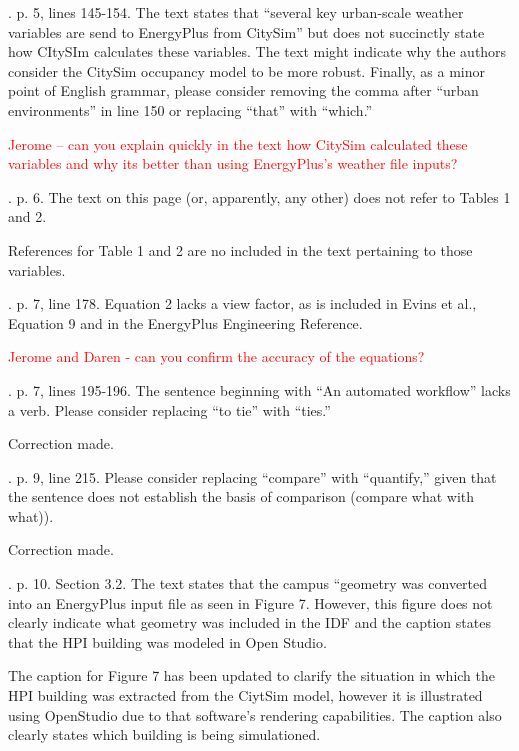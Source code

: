 \documentclass[answers,12pt]{exam}
\begin{document}
\begin{questions}
. p. 5, lines 145-154.  The text states that “several key urban-scale weather variables are send to EnergyPlus from CitySim” but does not succinctly state how CItySIm calculates these variables.  The text might indicate why the authors consider the CitySim occupancy model to be more robust.  Finally, as a minor point of English grammar, please consider removing the comma after “urban environments” in line 150 or replacing “that” with “which.” 
\begin{solution}
\textcolor{red}{Jerome -- can you explain quickly in the text how CitySim calculated these variables and why its better than using EnergyPlus's weather file inputs?}
\end{solution}

. p. 6.  The text on this page (or, apparently, any other) does not refer to Tables 1 and 2. 
\begin{solution}
References for Table 1 and 2 are no included in the text pertaining to those variables.
\end{solution}

. p. 7, line 178.  Equation 2 lacks a view factor, as is included in Evins et al., Equation 9 and in the EnergyPlus Engineering Reference. 
\begin{solution}
\textcolor{red}{Jerome and Daren - can you confirm the accuracy of the equations?}
\end{solution}

. p. 7, lines 195-196.  The sentence beginning with “An automated workflow” lacks a verb.  Please consider replacing “to tie” with “ties.” 
\begin{solution}
Correction made.
\end{solution}

. p. 9, line 215.  Please consider replacing “compare” with “quantify,” given that the sentence does not establish the basis of comparison (compare what with what)). 
\begin{solution}
Correction made.
\end{solution}

. p. 10. Section 3.2.  The text states that the campus “geometry was converted into an EnergyPlus input file as seen in Figure 7.  However, this figure does not clearly indicate what geometry was included in the IDF and the caption states that the HPI building was modeled in Open Studio.   
\begin{solution}
The caption for Figure 7 has been updated to clarify the situation in which the HPI building was extracted from the CiytSim model, however it is illustrated using
OpenStudio due to that software's rendering capabilities. The caption also clearly states which building is being simulationed.
\end{solution}


\end{questions}
\end{document}
